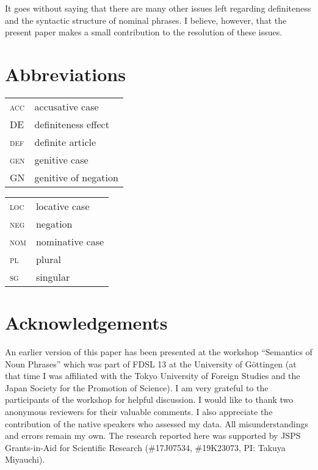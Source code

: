 \documentclass[output=paper,
colorlinks,
citecolor=brown,
newtxmath
]{langscibook}
\begin{document}
It goes without saying that there are many other issues left regarding definiteness and the syntactic structure of  nominal phrases. I believe, however, that the present paper makes a small contribution to the resolution of these issues.

\section*{Abbreviations}
\begin{tabularx}{.5\textwidth}{@{}lX@{}}
\textsc{acc} & accusative case\\
DE & definiteness effect\\
\textsc{def} & definite article\\
\textsc{gen} & genitive case\\
GN & genitive of negation\\
\end{tabularx}%
\begin{tabularx}{.5\textwidth}{@{}lX@{}}
\textsc{loc} & locative case\\
\textsc{neg} & negation\\
\textsc{nom} & nominative case\\
\textsc{pl} & plural\\
\textsc{sg} & singular\\
\end{tabularx}

\section*{Acknowledgements}
An earlier version of this paper has been presented at the workshop ``Semantics of Noun Phrases'' which was part of FDSL 13 at the University of Göttingen (at that time I was affiliated with the Tokyo University of Foreign Studies and the Japan Society for the Promotion of Science). I am very grateful to the participants of the workshop for helpful discussion. I would like to thank two anonymous reviewers for their valuable comments. I also appreciate the contribution of the native speakers who assessed my  data. All misunderstandings and errors remain my own. The research reported here was supported by JSPS Grants-in-Aid for Scientific Research (\#17J07534, \#19K23073, PI: Takuya Miyauchi).

\sloppy
\printbibliography[heading=subbibliography,notkeyword=this]
\end{document}
